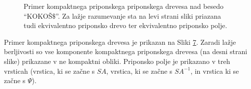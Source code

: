 \begin{figure}[htb]
    \begin{subfigure}[t]{0.4\linewidth}
        
        \begin{subfigure}[t]{1\linewidth}        
            
            \centering
            \subcaption*{}
            \label{fig:neKompaktnoDrevo}
        \end{subfigure}
        \begin{subfigure}[t]{1\linewidth}        
            
            \centering
            \subcaption*{}
            \label{fig:KompaktnoPolje}
        \end{subfigure}
        \centering
        \subcaption*{}
        \label{fig:neKompaktno}
    \end{subfigure}
    \begin{subfigure}[t]{0.6\linewidth}        
        \begin{subfigure}[t]{1\linewidth}  
            \hspace{0.25cm}      
            
            \subcaption*{}
            \label{fig:neKompaktnoDrevo}
        \end{subfigure}
        \begin{subfigure}[t]{1\linewidth}        
            
            \centering
            \subcaption*{}
            \label{fig:KompaktnoPolje}
        \end{subfigure}
        \subcaption*{}
        \label{fig:Kompaktno}
    \end{subfigure}
    \caption{Primer kompaktnega priponskega priponskega drevesa nad besedo \enquote{KOKOŠ$\$$}. Za lažje razumevanje sta na levi strani sliki priazana tudi ekvivalentno priponsko drevo ter ekvivalentno priponsko polje.} 
    \label{fig:CST}
\end{figure}

Primer kompaktnega priponskega drevesa je prikazan na Sliki \ref{fig:CST}. Zaradi lažje berljivosti so vse komponente kompaktnega priponskega drevesa (na desni strani slike) prikazane v ne kompaktni obliki. Priponsko polje je prikazano v treh vrsticah (vrstica, ki se začne s $SA$, vrstica, ki se začne s $SA^{-1}$, in vrstica ki se začne s $\Psi$).

